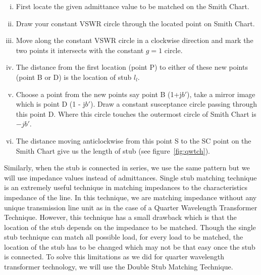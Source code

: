 \begin{enumerate}[(i)]
\item First locate the given admittance value to be matched on the Smith Chart.
\item Draw your constant VSWR circle through the located point on Smith Chart.
\item Move along the constant VSWR circle in a clockwise direction and mark the two points it intersects with the constant $g = 1$ circle.
\item The distance from the first location (point P) to either of these new points (point B or D) is the location of stub $l_l$.
\item Choose a point from the new points say point B (1+j$b'$), take a mirror image which is point D (1 - j$b'$). Draw a constant susceptance circle passing through this point D. Where this circle touches the outermost circle of Smith Chart is $-jb'$.
\item The distance moving anticlockwise from this point S to the SC point on the Smith Chart give us the length of stub (see figure~\ref{fig:qwtch}).
\end{enumerate}

Similarly, when the stub is connected in series, we use the same pattern but we will use impedance values instead of admittances. Single stub matching technique is an extremely useful technique in matching impedances to the characteristics impedance of the line. In this technique, we are matching impedance without any unique transmission line unit as in the case of a Quarter Wavelength Transformer Technique. However, this technique has a small drawback which is that the location of the stub depends on the impedance to be matched. Though the single stub technique can match all possible load, for every load to be matched, the location of the stub has to be changed which may not be that easy once the stub is connected. To solve this limitations as we did for quarter wavelength transformer technology, we will use the Double Stub Matching Technique.


